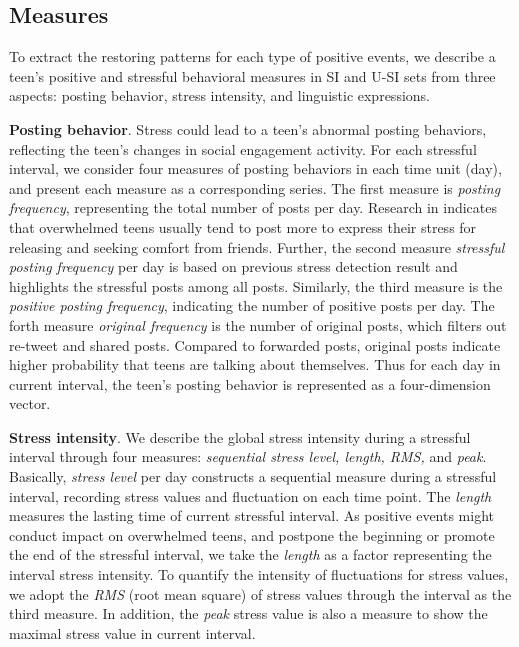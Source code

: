 \subsection{Measures}

To extract the restoring patterns  for each type of positive events,
we describe a teen's positive and stressful behavioral measures in SI and U-SI sets from three aspects:
posting behavior, stress intensity, and linguistic expressions.

\textbf{Posting behavior}.
Stress could lead to a teen's abnormal posting behaviors,
reflecting the teen's changes in social engagement activity.
For each stressful interval,
we consider four measures of posting behaviors in each time unit (day),
and present each measure as a corresponding series.
The first measure is \emph{posting frequency},
representing the total number of posts per day.
Research in \cite{Li2017Analyzing} indicates that overwhelmed teens usually tend to post more to express their stress for releasing
and seeking comfort from friends.
Further, the second measure \emph{stressful posting frequency} per day
is based on previous stress detection result and highlights the stressful posts among all posts.
Similarly, the third measure is the \emph{positive posting frequency}, indicating the number of positive posts per day.
The forth measure \emph{original frequency} is the number of original posts, which filters out re-tweet and shared posts.
Compared to forwarded posts, original posts indicate higher probability that teens are talking about themselves.
Thus for each day in current interval, the teen's posting behavior is represented as a four-dimension vector.

\textbf{Stress intensity}.
We describe the global stress intensity during a stressful interval through four measures:
\emph{sequential stress level, length, RMS,} and \emph{peak}.
Basically, \emph{stress level} per day constructs a sequential measure during a stressful interval,
recording stress values and fluctuation on each time point.
The \emph{length} measures the lasting time of current stressful interval.
As positive events might conduct impact on overwhelmed teens,
and postpone the beginning or promote the end of the stressful interval,
we take the \emph{length} as a factor representing the interval stress intensity.
To quantify the intensity of fluctuations for stress values,
we adopt the \emph{RMS} (root mean square) of stress values through the interval as the third measure.
In addition, the \emph{peak} stress value is also a measure to show the maximal stress value in current interval.

